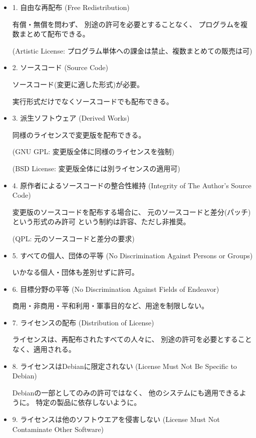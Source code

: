\documentclass[mingoth,a4paper]{jsarticle}
\begin{document}
\begin{itemize}
 \item 1. 自由な再配布 (Free Redistribution)

有償・無償を問わず、
別途の許可を必要とすることなく、
プログラムを複数まとめて配布できる。

(Artistic License: プログラム単体への課金は禁止、複数まとめての販売は可)

 \item 2. ソースコード (Source Code)

ソースコード(変更に適した形式)が必要。

実行形式だけでなくソースコードでも配布できる。

 \item 3. 派生ソフトウェア (Derived Works)

同様のライセンスで変更版を配布できる。

(GNU GPL: 変更版全体に同様のライセンスを強制)

(BSD License: 変更版全体には別ライセンスの適用可)

 \item 4. 原作者によるソースコードの整合性維持
   (Integrity of The Author's Source Code)

変更版のソースコードを配布する場合に、
元のソースコードと差分(パッチ)という形式のみ許可
という制約は許容、ただし非推奨。

(QPL: 元のソースコードと差分の要求)

 \item 5. すべての個人、団体の平等
   (No Discrimination Against Persons or Groups)

いかなる個人・団体も差別せずに許可。

 \item 6. 目標分野の平等
   (No Discrimination Against Fields of Endeavor)

商用・非商用・平和利用・軍事目的など、用途を制限しない。

 \item 7. ライセンスの配布
   (Distribution of License)

ライセンスは、再配布されたすべての人々に、
別途の許可を必要とすることなく、適用される。

 \item 8. ライセンスはDebianに限定されない
   (License Must Not Be Specific to Debian)

Debianの一部としてのみの許可ではなく、
他のシステムにも適用できるように。
特定の製品に依存しないように。

 \item 9. ライセンスは他のソフトウエアを侵害しない
   (License Must Not Contaminate Other Software)


\end{itemize}
\end{document}
